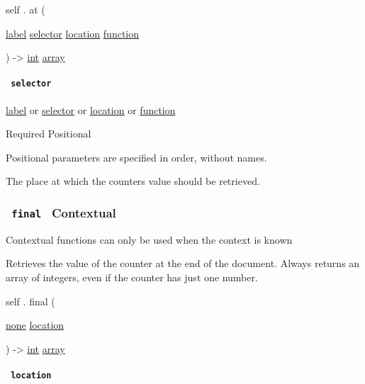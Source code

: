 self { . } { at } (

{ \href{/docs/reference/foundations/label/}{label}
\href{/docs/reference/foundations/selector/}{selector}
\href{/docs/reference/introspection/location/}{location}
\href{/docs/reference/foundations/function/}{function} }

) -\textgreater{} \href{/docs/reference/foundations/int/}{int}
\href{/docs/reference/foundations/array/}{array}

\paragraph{\texorpdfstring{\texttt{\ selector\ }}{ selector }}\label{definitions-at-selector}

\href{/docs/reference/foundations/label/}{label} {or}
\href{/docs/reference/foundations/selector/}{selector} {or}
\href{/docs/reference/introspection/location/}{location} {or}
\href{/docs/reference/foundations/function/}{function}

{Required} {{ Positional }}

\label{definitions-at-selector-positional-tooltip}
Positional parameters are specified in order, without names.

The place at which the counter\textquotesingle s value should be
retrieved.

\subsubsection{\texorpdfstring{\texttt{\ final\ } {{ Contextual
}}}{ final   Contextual }}\label{definitions-final}

\label{definitions-final-contextual-tooltip}
Contextual functions can only be used when the context is known

Retrieves the value of the counter at the end of the document. Always
returns an array of integers, even if the counter has just one number.

self { . } { final } (

{ \href{/docs/reference/foundations/none/}{none}
\href{/docs/reference/introspection/location/}{location} }

) -\textgreater{} \href{/docs/reference/foundations/int/}{int}
\href{/docs/reference/foundations/array/}{array}

\paragraph{\texorpdfstring{\texttt{\ location\ }}{ location }}\label{definitions-final-location}

